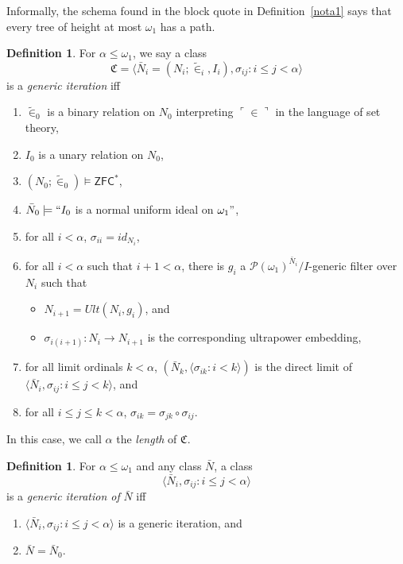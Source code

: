 \documentclass[12pt, twoside]{memoir}
\numberwithin{equation}{section}
\theoremstyle{definition}
\newtheorem{defi}[thm]{Definition}
\theoremstyle{remark}
\theoremstyle{definition}
\theoremstyle{definition}
\theoremstyle{definition}
\theoremstyle{remark}
\begin{document}
Informally, the schema found in the block quote in Definition~\ref{nota1} says that every tree of height at most $\omega_1$ has a path.

\begin{defi}\label{def257}
For $\alpha \leq \omega_1$, we say a class $$\mathfrak{C} = \langle \bar{N}_i = (N_i; \tilde{\in}_i, I_i), \sigma_{ij} : i \leq j < \alpha \rangle$$ is a \emph{generic iteration} iff 
\begin{enumerate}[label=(\alph*)]
    \item $\tilde{\in}_0$ is a binary relation on $N_0$ interpreting $\ulcorner \in \urcorner$ in the language of set theory,
    \item $I_0$ is a unary relation on $N_0$,
    \item $(N_0; \tilde{\in}_0) \models \mathsf{ZFC}^*$,
    \item $\bar{N}_0 \models ``I_0$ is a normal uniform ideal on $\omega_1"$, 
    \item for all $i < \alpha$, $\sigma_{ii} = id_{N_i}$,
    \item for all $i < \alpha$ such that $i + 1 < \alpha$, there is $g_{i}$ a $\mathcal{P}(\omega_1)^{\bar{N}_{i}} / I$-generic filter over $N_{i}$ such that 
    \begin{itemize}[label=$\circ$]
        \item $N_{i + 1} = Ult(N_{i}, g_{i})$, and
        \item $\sigma_{i(i + 1)} : N_{i} \longrightarrow N_{i + 1}$ is the corresponding ultrapower embedding,
    \end{itemize}
    \item for all limit ordinals $k < \alpha$, $(\bar{N}_{k}, \langle \sigma_{ik} : i < k \rangle)$ is the direct limit of $\langle \bar{N}_i, \sigma_{ij} : i \leq j < k \rangle$, and
    \item for all $i \leq j \leq k < \alpha$, $\sigma_{ik} = \sigma_{jk} \circ \sigma_{ij}$.
\end{enumerate}
In this case, we call $\alpha$ the \emph{length} of $\mathfrak{C}$.
\end{defi}

\begin{defi}
For $\alpha \leq \omega_1$ and any class $\bar{N}$, a class $$\langle \bar{N}_i, \sigma_{ij} : i \leq j < \alpha \rangle$$ is a \emph{generic iteration of} $\bar{N}$ iff 
\begin{enumerate}[label=(\alph*)]
    \item $\langle \bar{N}_i, \sigma_{ij} : i \leq j < \alpha \rangle$ is a generic iteration, and
    \item $\bar{N} = \bar{N}_0$.
\end{enumerate}
\end{defi}
\end{document}
